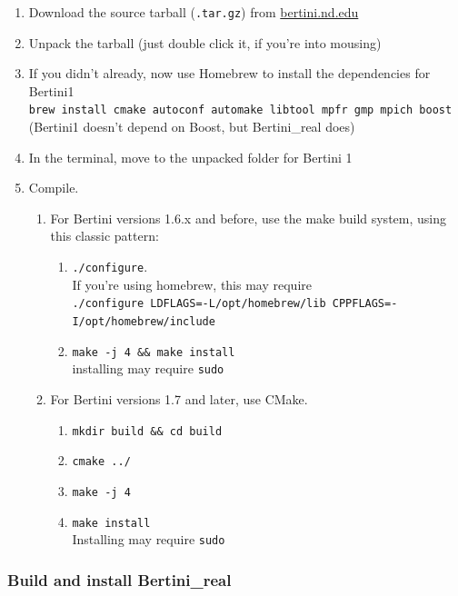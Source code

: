 \begin{enumerate}
  \item Download the source tarball ({\tt .tar.gz}) from \href{http://bertini.nd.edu}{bertini.nd.edu}
  \item Unpack the tarball (just double click it, if you're into mousing)
  \item If you didn't already, now use Homebrew to install the dependencies for Bertini1 \\{\tt brew install cmake autoconf automake libtool mpfr gmp mpich boost}\\ (Bertini1 doesn't depend on Boost, but Bertini\_real does)
  \item In the terminal, move to the unpacked folder for Bertini 1

  \item Compile.
  \begin{enumerate}

    \item For Bertini versions 1.6.x and before, use the make build system, using this classic pattern:
    \begin{enumerate}
      \item {\tt ./configure}.  \\ If you're using homebrew, this may require \\ \verb|./configure LDFLAGS=-L/opt/homebrew/lib CPPFLAGS=-I/opt/homebrew/include| 
      \item {\tt make -j 4 \&\& make install}\\ installing may require \verb|sudo|
    \end{enumerate}

    \item For Bertini versions 1.7 and later, use CMake.
      \begin{enumerate}
        \item \verb|mkdir build && cd build|
        \item \verb|cmake ../|
        \item \verb|make -j 4|
        \item \verb|make install| \\ Installing may require \verb|sudo|
      \end{enumerate}
  \end{enumerate}
\end{enumerate}

\subsubsection{Build and install Bertini\_real}

